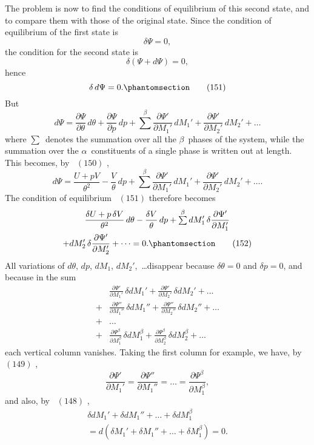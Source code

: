 \documentclass[12pt]{book}[2005/09/16]
\newcommand{\Chg}[2]{#2}
\newcommand{\Add}[1]{\Chg{}{#1}}
\newcommand{\Erratum}[2]{#2}
\newcommand{\Tag}[1]{%
  \phantomsection\label{eqn:#1}\tag*{\ensuremath{#1}}%
}
\newcommand{\Eq}[1]{%
  \hyperref[eqn:#1]{\ensuremath{#1}}%
}
\newcommand{\PageSep}[1]{\ignorespaces}
\newcommand{\dd}{\partial}
\newcommand{\tsum}{\mathop{\textstyle\sum}\limits}
\begin{document}
The problem is now to find the conditions of equilibrium
of this second state, and to compare them with those of the
original state. Since the condition of equilibrium of the
first state is
\[
\delta \Psi = 0,
\]
the condition for the second state is
\[
\delta (\Psi + d\Psi) = 0,
\]
hence
\[
\delta\, d\Psi = 0\Add{.}
\Tag{(151)}
\]
\PageSep{185}
But
\[
d\Psi = \frac{\dd \Psi}{\dd \theta}\, d\theta + \frac{\dd \Psi}{\dd p}\, dp
  + \tsum^{\beta} \frac{\dd \Psi'}{\dd M_{1}'}\, dM_{1}' + \frac{\dd \Psi'}{\dd M_{2}'}\, \Erratum{dM_{2}}{dM_{2}'} + \dots
\]
where $\tsum$~denotes the summation over all the $\beta$~phases of
the system, while the summation over the $\alpha$~constituents of
a single phase is written out at length. This becomes, by~\Eq{(150)},
\[
d\Psi = \frac{U + pV}{\theta^{2}} - \frac{V}{\theta}\, dp
  + \tsum^{\beta} \frac{\dd \Psi'}{\dd M_{1}'}\, dM_{1}' + \frac{\dd \Psi'}{\dd M_{2}'}\, dM_{2}' + \dots\Add{.}
\]
The condition of equilibrium~\Eq{(151)} therefore becomes
\begin{multline*}
\frac{\delta U + p\, \delta V}{\theta^{2}}\, d\theta - \frac{\delta V}{\theta}\, dp
  + \tsum^{\beta} dM_{1}' \, \delta\frac{\dd \Psi'}{\dd M_{1}'} \\
  + dM_{2}' \, \delta\frac{\dd \Psi'}{\dd M_{2}'} + \dots = 0\Add{.}
\Tag{(152)}
\end{multline*}
All variations of $d\theta$, $dp$, $dM_{1}$, $dM_{2}'$,~\dots disappear because
$\delta \theta = 0$ and $\delta p = 0$, and because in the sum
\begin{align*}
& \frac{\dd \Psi'}{\dd M_{1}'}\, \delta dM_{1}' + \frac{\dd \Psi'}{\dd M_{2}'}\, \delta dM_{2}' + \dots \\
+ & \frac{\dd \Psi''}{\dd M_{1}''}\, \delta dM_{1}'' + \frac{\dd \Psi''}{\dd M_{2}''}\, \delta dM_{2}'' + \dots \\
+ & \dots \\
+& \frac{\dd \Psi^{\beta}}{\dd M_{1}^{\beta}}\, \delta dM_{1}^{\beta} + \frac{\dd \Psi^{\beta}}{\dd M_{2}^{\beta}}\, \delta dM_{2}^{\beta} + \dots
\end{align*}
each vertical column vanishes. Taking the first column for
example, we have, by~\Eq{(149)},
\[
\frac{\dd \Psi'}{\dd M_{1}'} = \frac{\dd \Psi''}{\dd M_{1}''} = \dots = \frac{\dd \Psi^{\beta}}{\dd M_{1}^{\beta}},
\]
\PageSep{186}
and also, by~\Eq{(148)},
\begin{multline*}
\delta dM_{1}' + \delta dM_{1}'' + \dots + \delta dM_{1}^{\beta} \\
  = d(\delta M_{1}' + \delta M_{1}'' + \dots + \delta M_{1}^{\beta}) = 0.
\end{multline*}
\end{document}
